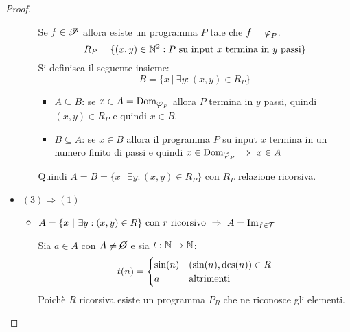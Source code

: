 \begin{proof}
\begin{itemize}
\begin{itemize}
            Se $f\in\mathscr{P}$ allora esiste un programma $P$ tale che $f=\semRAM_P$.
            $$ R_P = \{(x,y)\in\mathbb{N}^2:\text{$P$ su input $x$ termina in $y$ passi}\} $$
            Si definisca il seguente insieme:
            $$ B=\{ x\ |\ \exists y:(x,y)\in R_P \} $$
            \begin{itemize}
                \item[\textminus] $A\subseteq B$:
                    se $x\in A=\text{Dom}_{\semRAM_P}$ allora $P$ termina in $y$ passi,
                    quindi $(x,y)\in R_P$ e quindi $x\in B$.
                \item[\textminus] $B\subseteq A$: se $x\in B$ allora il programma $P$
                    su input $x$ termina in un numero finito di passi e quindi
                    $ x\in\text{Dom}_{\semRAM_P} \ \Rightarrow \ x\in A$
            \end{itemize}
            Quindi $A=B=\{ x\ |\ \exists y:(x,y)\in R_P \}$ con $R_P$ relazione ricorsiva.
        \end{itemize}
        \item $(3)\Rightarrow(1)$
            \begin{itemize}
                \item[] $A=\{ x\ |\ \exists y:(x,y)\in R\}\text{ con $r$ ricorsivo}
                \ \Rightarrow \ A=\text{Im}_{f\in\mathcal{T}}$

                Sia $a\in A$ con $A\neq\cancel{O}$ e sia $t:\mathbb{N}\to\mathbb{N}$:
                $$ t(n) = \begin{cases}
                    \text{sin}(n) & (\text{sin}(n),\text{des}(n))\in R\\
                    a & \text{altrimenti}
                \end{cases} $$
                Poichè $R$ ricorsiva esiste un programma $P_R$ che ne riconosce gli elementi.


\end{itemize}
\end{itemize}
\end{proof}
